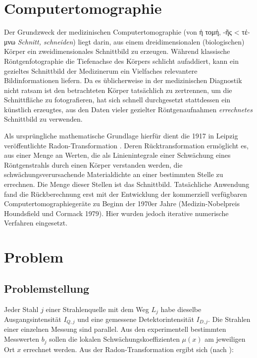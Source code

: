 \renewcommand*{\arraystretch}{1.0} %

\chapter{Computertomographie}
Der Grundzweck der medizinischen Computertomographie (von \textgreek{ἡ τομή, -ῆς} < \textgreek{τέμνω} \textit{Schnitt, schneiden}) liegt darin, aus einem dreidimensionalen (biologischen) Körper ein zweidimensionales Schnittbild zu erzeugen.
Während klassische Röntgenfotographie die Tiefenachse des Körpers schlicht aufaddiert, kann ein gezieltes Schnittbild der Mediziner\ggin um ein Vielfaches relevantere Bildinformationen liefern. Da es üblicherweise in der medizinischen Diagnostik nicht ratsam ist den betrachteten Körper tatsächlich zu zertrennen, um die Schnittfläche zu fotografieren, hat sich schnell durchgesetzt stattdessen ein künstlich erzeugtes, aus den Daten vieler gezielter Röntgenaufnahmen \textit{errechnetes} Schnittbild zu verwenden.

Als ursprüngliche mathematische Grundlage hierfür dient die 1917 in Leipzig veröffentlichte Radon-Transformation \cite{Radon1917}.
Deren Rücktransformation ermöglicht es, aus einer Menge an Werten, die als Linienintegrale einer Schwächung eines Röntgenstrahls durch einen Körper verstanden werden, die schwächungsverursachende Materialdichte an einer bestimmten Stelle zu errechnen. Die Menge dieser Stellen ist das Schnittbild. Tatsächliche Anwendung fand die Rückberechnung erst mit der Entwicklung der kommerziell verfügbaren Computertomographiegeräte zu Beginn der 1970er Jahre (Medizin-Nobelpreis Houndsfield und Cormack 1979). Hier wurden jedoch iterative numerische Verfahren eingesetzt.

\chapter{Problem}
\section{Problemstellung}
Jeder Stahl $j$ einer Strahlenquelle mit dem Weg $L_j$ habe dieselbe Ausgangsintensität $I_{Q,j}$ und eine gemessene Detektorintensität $I_{D,j}$. Die Strahlen einer einzelnen Messung sind parallel.
Aus den experimentell bestimmten Messwerten $b_{j}$ sollen die lokalen Schwächungskoeffizienten $\mu (x)$ am jeweiligen Ort $x$ errechnet werden. 
Aus der Radon-Transformation ergibt sich (nach \cite{Hochbruck2002}):

